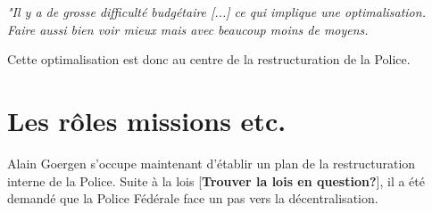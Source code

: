 \documentclass[12pt]{article}
\begin{document}

\begin{center}
	\textit{"Il y a de grosse difficulté budgétaire [...] ce qui implique une optimalisation. Faire aussi bien voir mieux mais avec beaucoup moins de moyens.}
\end{center} 

Cette optimalisation est donc au centre de la restructuration de la Police.


\section{Les rôles missions etc.}
Alain Goergen s'occupe maintenant d'établir un plan de la restructuration interne de la Police. Suite à la lois [\textbf{Trouver la lois en question?}], il a été demandé que la Police Fédérale face un pas vers la décentralisation.\\





\end{document}
